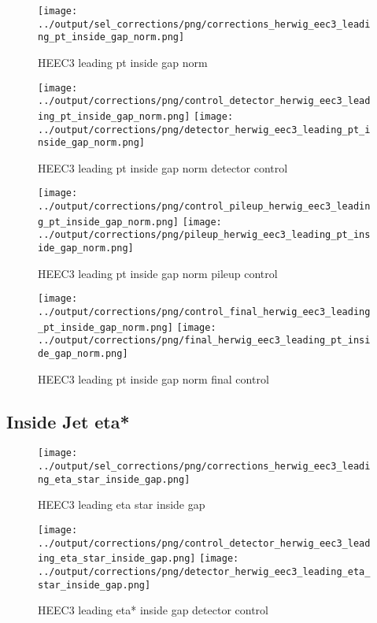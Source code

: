 \documentclass[11pt]{book}
\begin{document}
\begin{figure}[ht]
\centering
\texttt{[image: ../output/sel\_corrections/png/corrections\_herwig\_eec3\_leading\_pt\_inside\_gap\_norm.png]}
\caption{HEEC3 leading pt inside gap norm}
\label{fig:HEEC3_leading_pt_inside_gap_norm}
\end{figure}

\begin{figure}[ht]
\centering
\texttt{[image: ../output/corrections/png/control\_detector\_herwig\_eec3\_leading\_pt\_inside\_gap\_norm.png]}
\texttt{[image: ../output/corrections/png/detector\_herwig\_eec3\_leading\_pt\_inside\_gap\_norm.png]}
\caption{HEEC3 leading pt inside gap norm detector control}
\label{fig:HEEC3_leading_pt_inside_gap_norm_detector_control}
\end{figure}

\begin{figure}[ht]
\centering
\texttt{[image: ../output/corrections/png/control\_pileup\_herwig\_eec3\_leading\_pt\_inside\_gap\_norm.png]}
\texttt{[image: ../output/corrections/png/pileup\_herwig\_eec3\_leading\_pt\_inside\_gap\_norm.png]}
\caption{HEEC3 leading pt inside gap norm pileup control}
\label{fig:HEEC3_leading_pt_inside_gap_norm_pileup_control}
\end{figure}


\begin{figure}[ht]
\centering
\texttt{[image: ../output/corrections/png/control\_final\_herwig\_eec3\_leading\_pt\_inside\_gap\_norm.png]}
\texttt{[image: ../output/corrections/png/final\_herwig\_eec3\_leading\_pt\_inside\_gap\_norm.png]}
\caption{HEEC3 leading pt inside gap norm final control}
\label{fig:HEEC3_leading_pt_inside_gap_norm_final_control}
\end{figure}



\clearpage
\subsection{Inside Jet eta*}
\begin{figure}[ht]
\centering
\texttt{[image: ../output/sel\_corrections/png/corrections\_herwig\_eec3\_leading\_eta\_star\_inside\_gap.png]}
\caption{HEEC3 leading eta star inside gap}
\label{fig:HEEC3_leading_eta_star_inside_gap}
\end{figure}


\begin{figure}[ht]
\centering
\texttt{[image: ../output/corrections/png/control\_detector\_herwig\_eec3\_leading\_eta\_star\_inside\_gap.png]}
\texttt{[image: ../output/corrections/png/detector\_herwig\_eec3\_leading\_eta\_star\_inside\_gap.png]}
\caption{HEEC3 leading eta* inside gap detector control}
\label{fig:HEEC3_leading_eta_star_inside_gap_detector_control}
\end{figure}
\end{document}
